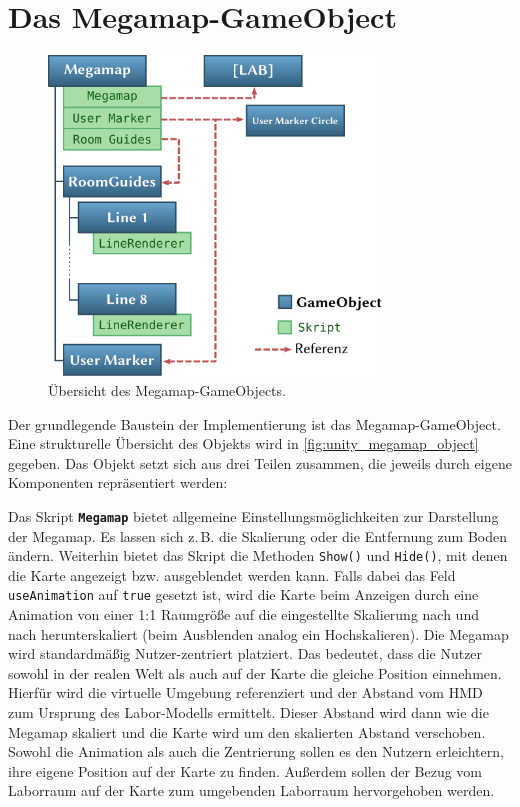 \section{Das Megamap-GameObject}
\begin{figure}[t]
    \centering
    \includegraphics[height=8.5cm]{figures/unity_megamap_object}
    \caption{Übersicht des Megamap-GameObjects.}
    \label{fig:unity_megamap_object}
\end{figure}

Der grundlegende Baustein der Implementierung ist das Megamap-GameObject.
Eine strukturelle Übersicht des Objekts wird in \autoref{fig:unity_megamap_object} gegeben.
Das Objekt setzt sich aus drei Teilen zusammen, die jeweils durch eigene Komponenten repräsentiert werden:

Das Skript \textbf{\lstinline{Megamap}} bietet allgemeine Einstellungsmöglichkeiten zur Darstellung der Megamap.
Es lassen sich z.\,B. die Skalierung oder die Entfernung zum Boden ändern.
Weiterhin bietet das Skript die Methoden \lstinline{Show()} und \lstinline{Hide()}, mit denen die Karte angezeigt bzw. ausgeblendet werden kann.
Falls dabei das Feld \lstinline{useAnimation} auf \lstinline{true} gesetzt ist, wird die Karte beim Anzeigen durch eine Animation von einer 1:1 Raumgröße auf die eingestellte Skalierung nach und nach herunterskaliert (beim Ausblenden analog ein Hochskalieren).
Die Megamap wird standardmäßig Nutzer-zentriert platziert.
Das bedeutet, dass die Nutzer sowohl in der realen Welt als auch auf der Karte die gleiche Position einnehmen.
Hierfür wird die virtuelle Umgebung referenziert und der Abstand vom HMD zum Ursprung des Labor-Modells ermittelt.
Dieser Abstand wird dann wie die Megamap skaliert und die Karte wird um den skalierten Abstand verschoben.
Sowohl die Animation als auch die Zentrierung sollen es den Nutzern erleichtern, ihre eigene Position auf der Karte zu finden.
Außerdem sollen der Bezug vom Laborraum auf der Karte zum umgebenden Laborraum hervorgehoben werden.

